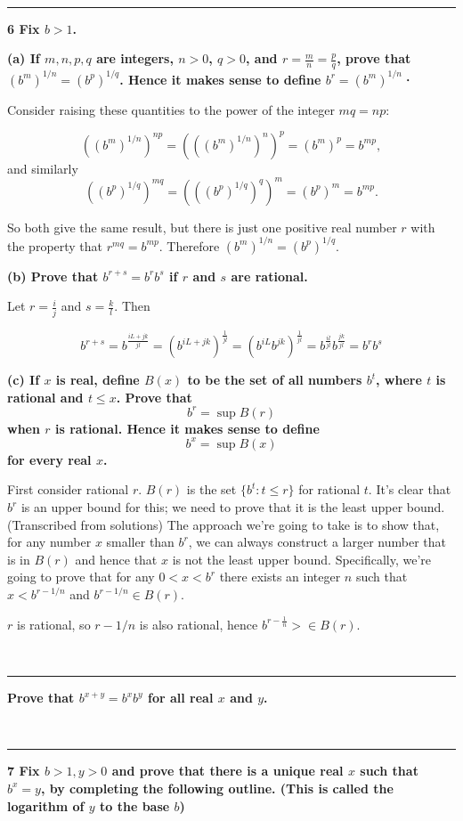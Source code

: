 ~\\\hrule
\textbf{6 Fix $b > 1$.}

\textbf{
(a) If $m,n,p,q$ are integers, $n>0$, $q>0$, and $r=\frac{m}{n}=\frac{p}{q}$,
prove that $(b^m)^{1/n} = (b^p)^{1/q}$. Hence it makes sense to define $b^r =
(b^m)^{1/n}$·}

Consider raising these quantities to the power of the integer $mq = np$:

$$
((b^m)^{1/n})^{np} = (((b^m)^{1/n})^{n})^p = (b^m)^p = b^{mp},
$$
and similarly
$$
((b^p)^{1/q})^{mq} = (((b^p)^{1/q})^{q})^m = (b^p)^m = b^{mp}.
$$

So both give the same result, but there is just one positive real number $r$
with the property that $r^{mq} = b^{mp}$. Therefore $(b^m)^{1/n} =
(b^p)^{1/q}$.

\textbf{
(b) Prove that $b^{r+s} = b^rb^s$ if $r$ and $s$ are rational.
}

Let $r=\frac{i}{j}$ and $s=\frac{k}{l}$. Then

$$
b^{r+s} =
b^\frac{iL + jk}{jl} =
(b^{iL + jk})^\frac{1}{jl} =
(b^{iL}b^{jk})^\frac{1}{jl} =
b^\frac{il}{jl}b^\frac{jk}{jl} =
b^{r}b^{s}
$$

\textbf{(c) If $x$ is real, define $B(x)$ to be the set of all numbers $b^t$, where
$t$ is rational and $t \leq x$. Prove that $$b^r = \sup B(r)$$ when $r$ is
rational. Hence it makes sense to define $$b^x = \sup B(x)$$ for every real $x$.
}

First consider rational $r$. $B(r)$ is the set $\{b^t: t \leq r\}$ for rational
$t$. It's clear that $b^r$ is an upper bound for this; we need to prove that it
is the least upper bound. (Transcribed from solutions) The approach we're going
to take is to show that, for any number $x$ smaller than $b^r$, we can always
construct a larger number that is in $B(r)$ and hence that $x$ is not the least
upper bound. Specifically, we're going to prove that for any $0 < x < b^r$
there exists an integer $n$ such that $x < b^{r - 1/n}$ and $b^{r - 1/n} \in
B(r)$.

$r$ is rational, so $r - 1/n$ is also rational, hence $b^{r - \frac{1}{n}}> \in B(r)$.

~\\\hrule
\textbf{Prove that $b^{x+y} = b^xb^y$ for all real $x$ and $y$. }

~\\\hrule
\textbf{7 Fix $b > 1, y > 0$ and prove that there is a unique real $x$ such that
$b^x = y$, by completing the following outline. (This is called the logarithm
of $y$ to the base $b$)}

